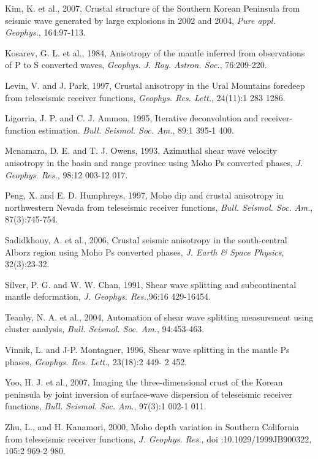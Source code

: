 \documentclass{article}
\begin{document}
\begin{thebibliography}{99}
\item Kim, K. et al., 2007, Crustal structure of the Southern Korean Peninsula from seismic wave generated by large explosions in 2002 and 2004, \textit{Pure appl. Geophys.}, 164:97-113.

\item Kosarev, G. L. et al., 1984, Anisotropy of the mantle inferred from      observations of P to S converted waves, \textit{Geophys. J. Roy. Astron. Soc.}, 76:209-220.

\item Levin, V. and J. Park, 1997, Crustal anisotropy in the Ural Mountains foredeep from teleseismic receiver functions, \textit{Geophys. Res. Lett.}, 24(11):1 283 1286.

\item Ligorria, J. P. and C. J. Ammon, 1995, Iterative deconvolution and receiver-function estimation. \textit{Bull. Seismol. Soc. Am.}, 89:1 395-1 400.

\item Mcnamara, D. E. and T. J. Owens, 1993, Azimuthal shear wave velocity anisotropy in the basin and range province using Moho Ps converted phases, \textit{J. Geophys. Res.}, 98:12 003-12 017.

\item Peng, X. and E. D. Humphreys, 1997, Moho dip and crustal anisotropy in northwestern Nevada from teleseismic receiver functions, \textit{Bull. Seismol. Soc. Am.},  87(3):745-754.

\item Sadidkhouy, A. et al., 2006, Crustal seismic anisotropy in the south-central Alborz region using Moho Ps converted phases, \textit{J. Earth \& Space Physics}, 32(3):23-32.

\item Silver, P. G. and W. W. Chan, 1991, Shear wave splitting and subcontinental mantle deformation, \textit{J. Geophys. Res.},96:16 429-16454.

\item Teanby, N. A. et al., 2004, Automation of shear wave splitting measurement using cluster analysis, \textit{Bull. Seismol. Soc. Am.}, 94:453-463.

\item Vinnik, L. and J-P. Montagner, 1996, Shear wave splitting in the mantle Ps phases, \textit{Geophys. Res. Lett.}, 23(18):2 449- 2 452.

\item Yoo, H. J. et al., 2007, Imaging the three-dimensional crust of the Korean peninsula by joint inversion of surface-wave dispersion of teleseismic receiver functions, \textit{Bull. Seismol. Soc. Am.}, 97(3):1 002-1 011.

\item Zhu, L., and H. Kanamori, 2000, Moho depth variation in Southern California from teleseismic receiver functions, \textit{J. Geophys. Res.}, doi :10.1029/1999JB900322, 105:2 969-2 980.

\end{thebibliography}
%
%
%
%
\end{document}
